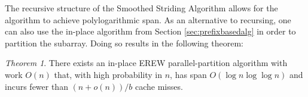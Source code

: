 \documentclass[sigconf, 10pt, nonacm]{acmart}
\newcommand{\defn}[1]{{\textit{\textbf{\boldmath #1}}}}
\renewcommand{\paragraph}[1]{\vspace{0.09in}\noindent{\bf \boldmath #1.}}
\theoremstyle{remark}
\newtheorem{theorem}{Theorem}[section]
\theoremstyle{remark}
\begin{document}
The recursive structure of the Smoothed Striding Algorithm allows for
the algorithm to achieve polylogarithmic span. As an alternative to
recursing, one can also use the in-place algorithm from Section \ref{sec:prefixbasedalg}
 in order to partition the subarray. Doing so results in the following theorem:
\begin{theorem}
  \label{thm:nicethm}
  There exists an in-place EREW parallel-partition algorithm with
  work $O(n)$ that, with high probability in $n$, has span $O(\log n \log \log
  n)$ and incurs fewer than $(n+o(n))/b$ cache misses.
\end{theorem}



\end{document}
